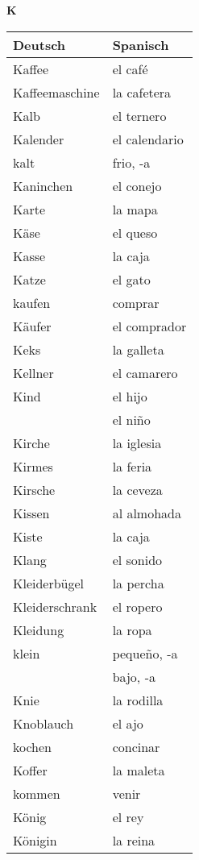 \begin{flushright}\begin{Huge}\textbf{K}\end{Huge}\end{flushright}

\begin{longtable}{p{} p{}} 
\textbf{Deutsch}     & \textbf{Spanisch}                                       \\ \hline
\hline
\endhead %
Kaffee & el café\\
Kaffeemaschine & la cafetera\\
Kalb & el ternero\\
Kalender & el calendario\\
kalt & frio, -a\\
Kaninchen & el conejo\\
Karte & la mapa\\
Käse & el queso\\
Kasse & la caja\\
Katze & el gato \\
kaufen & comprar\\
Käufer & el comprador\\
Keks & la galleta\\
Kellner & el camarero\\
Kind & el hijo\\
~ & el niño\\
Kirche & la iglesia\\
Kirmes & la feria\\
Kirsche & la ceveza\\
Kissen & al almohada\\
Kiste & la caja\\
Klang & el sonido\\
Kleiderbügel & la percha\\
Kleiderschrank & el ropero\\
Kleidung & la ropa\\
klein & pequeño, -a\\
~ & bajo, -a\\
Knie & la rodilla\\
Knoblauch & el ajo\\
kochen & concinar\\
Koffer & la maleta\\
kommen & venir \\
König & el rey\\
Königin & la reina\\

\end{longtable}
